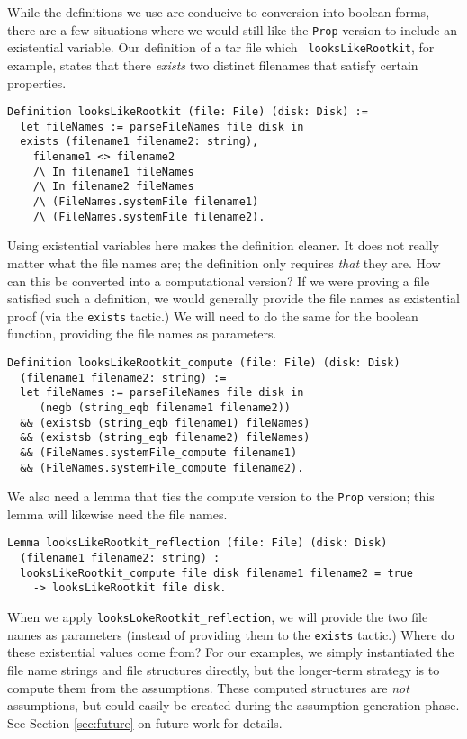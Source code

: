 \documentclass[nocopyrightspace]{sigplanconf}
\begin{document}
While the definitions we use are conducive to conversion into boolean forms,
there are a few situations where we would still like the {\tt Prop} version to
include an existential variable. Our definition of a tar file which {\tt
looksLikeRootkit}, for example, states that there {\em exists} two distinct
filenames that satisfy certain properties.

\begin{lstlisting}
Definition looksLikeRootkit (file: File) (disk: Disk) :=
  let fileNames := parseFileNames file disk in
  exists (filename1 filename2: string),
    filename1 <> filename2
    /\ In filename1 fileNames
    /\ In filename2 fileNames
    /\ (FileNames.systemFile filename1)
    /\ (FileNames.systemFile filename2).
\end{lstlisting}

Using existential variables here makes the definition cleaner. It does not
really matter what the file names are; the definition only requires {\em that}
they are. How can this be converted into a computational version? If we were
proving a file satisfied such a definition, we would generally provide the
file names as existential proof (via the {\tt exists} tactic.) We will need to
do the same for the boolean function, providing the file names as parameters.

\begin{lstlisting}
Definition looksLikeRootkit_compute (file: File) (disk: Disk)
  (filename1 filename2: string) :=
  let fileNames := parseFileNames file disk in
     (negb (string_eqb filename1 filename2))
  && (existsb (string_eqb filename1) fileNames)
  && (existsb (string_eqb filename2) fileNames)
  && (FileNames.systemFile_compute filename1)
  && (FileNames.systemFile_compute filename2).
\end{lstlisting}

We also need a lemma that ties the compute version to the {\tt Prop} version;
this lemma will likewise need the file names.

\begin{lstlisting}
Lemma looksLikeRootkit_reflection (file: File) (disk: Disk)
  (filename1 filename2: string) :
  looksLikeRootkit_compute file disk filename1 filename2 = true
    -> looksLikeRootkit file disk.
\end{lstlisting}

When we apply {\tt looksLokeRootkit\_reflection}, we will provide the two file
names as parameters (instead of providing them to the {\tt exists} tactic.)
Where do these existential values come from? For our examples, we simply
instantiated the file name strings and file structures directly, but the
longer-term strategy is to compute them from the assumptions. These computed
structures are {\em not} assumptions, but could easily be created during the
assumption generation phase. See Section \ref{sec:future} on future work for
details.
\end{document}
